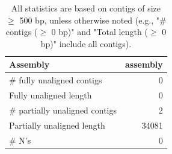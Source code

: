 \documentclass[12pt,a4paper]{article}
\begin{document}
\begin{table}[ht]
\begin{center}
\caption{All statistics are based on contigs of size $\geq$ 500 bp, unless otherwise noted (e.g., "\# contigs ($\geq$ 0 bp)" and "Total length ($\geq$ 0 bp)" include all contigs).}
\begin{tabular}{|l*{1}{|r}|}
\hline
Assembly & assembly \\ \hline
\# fully unaligned contigs & 0 \\ \hline
Fully unaligned length & 0 \\ \hline
\# partially unaligned contigs & 2 \\ \hline
Partially unaligned length & 34081 \\ \hline
\# N's & 0 \\ \hline
\end{tabular}
\end{center}
\end{table}
\end{document}
